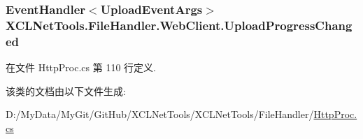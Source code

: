 \hypertarget{class_x_c_l_net_tools_1_1_file_handler_1_1_web_client_abe950fa329508b4c52e3181aeb97585f}{
\subsubsection[{Upload\-Progress\-Changed}]{\setlength{\rightskip}{0pt plus 5cm}Event\-Handler$<${\bf Upload\-Event\-Args}$>$ X\-C\-L\-Net\-Tools.\-File\-Handler.\-Web\-Client.\-Upload\-Progress\-Changed}}\label{class_x_c_l_net_tools_1_1_file_handler_1_1_web_client_abe950fa329508b4c52e3181aeb97585f}


在文件 Http\-Proc.\-cs 第 110 行定义.



该类的文档由以下文件生成\-:\begin{DoxyCompactItemize}
\item 
D\-:/\-My\-Data/\-My\-Git/\-Git\-Hub/\-X\-C\-L\-Net\-Tools/\-X\-C\-L\-Net\-Tools/\-File\-Handler/\hyperlink{_http_proc_8cs}{Http\-Proc.\-cs}\end{DoxyCompactItemize}
